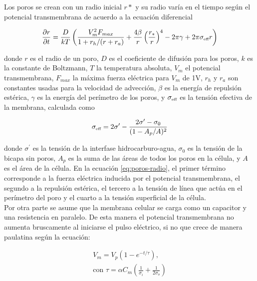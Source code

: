\documentclass[a4paper,10pt]{article}
\begin{document}
Los poros se crean con un radio inicial $r*$ y su radio varía en el tiempo según el potencial transmembrana de acuerdo a la ecuación diferencial

\begin{equation} \label{eq:poros-radio}
	\frac{\partial r}{\partial t} = \frac{D}{kT} \left( \frac{V_m^2 F_{max}}{1+r_h / (r+r_a)} + \frac{4 \beta}{r} \left(\frac{r_*}{r}\right)^4 - 2 \pi \gamma + 2 \pi \sigma_{\textrm{\tiny eff}} r\right)
\end{equation}

donde $r$ es el radio de un poro, $D$ es el coeficiente de difusión para los poros, $k$ es la constante de Boltzmann, $T$ la temperatura absoluta, $V_m$ el potencial transmembrana, $F_{max}$ la máxima fuerza eléctrica para $V_m$ de 1V, $r_h$ y $r_a$ son constantes usadas para la velocidad de advección, $\beta$ es la energía de repulsión estérica, $\gamma$ es la energía del perímetro de los poros, y $\sigma_{\textrm{\tiny eff}}$ es la tensión efectiva de la membrana, calculada como

\begin{equation}
	\sigma_{\textrm{\tiny eff}} = 2 \sigma^\prime - \frac{2 \sigma^\prime - \sigma_0}{(1 - A_p / A)^2}
\end{equation}

donde $\sigma^\prime$ es la tensión de la interfase hidrocarburo-agua, $\sigma_0$ es la tensión de la bicapa sin poros, $A_p$ es la suma de las áreas de todos los poros en la célula, y $A$ es el área de la célula. En la ecuación \ref{eq:poros-radio}, el primer término corresponde a la fuerza eléctrica inducida por el potencial transmembrana, el segundo a la repulsión estérica, el tercero a la tensión de línea que actúa en el perímetro del poro y el cuarto a la tensión superficial de la célula.\\

Por otra parte se asume que la membrana celular se carga como un capacitor y una resistencia en paralelo. De esta manera el potencial transmembrana no aumenta bruscamente al iniciarse el pulso eléctrico, si no que crece de manera paulatina según la ecuación: 

\begin{equation} \label{eq:capacit} \begin{split}
	V_m = V_p (1 - e^{-t/\tau}) , \\ \textrm{con } \tau = \alpha C_m \left( \frac{1}{\sigma_i} + \frac{1}{2 \sigma_o} \right)
\end{split} \end{equation}
\end{document}
